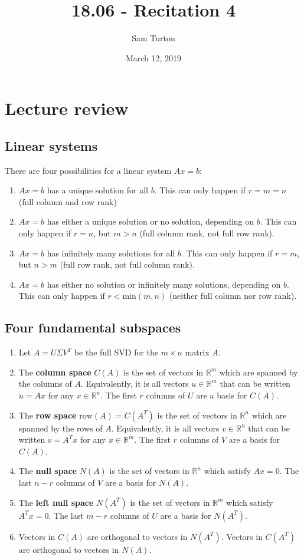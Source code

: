 \documentclass[11pt]{article}
\title{18.06 - Recitation 4}
\author{Sam Turton}
\date{March 12, 2019}
\begin{document}
\maketitle

\section{Lecture review}
\subsection{Linear systems}
There are four possibilities for a linear system $Ax = b$: 
\begin{enumerate}
\item $Ax = b$ has a unique solution for all $b$. This can only happen if $r=m=n$ (full column and row rank)
\item $Ax=b$ has either a unique solution or no solution, depending on $b$. This can only happen if $r=n$, but $m>n$ (full column rank, not full row rank).
\item $Ax=b$ has infinitely many solutions for all $b$. This can only happen if $r=m$, but $n>m$ (full row rank, not full column rank).
\item $Ax = b$ has either no solution or infinitely many solutions, depending on $b$. This can only happen if $r<\text{min}(m,n)$ (neither full column nor row rank). 
\end{enumerate}


\subsection{Four fundamental subspaces}
\begin{enumerate}
\item Let $A=U\Sigma V^T$ be the full SVD for the $m\times n$ matrix $A$. 
\item The \textbf{column space} $C(A)$ is the set of vectors in $\mathbb{R}^m$ which are spanned by the columns of $A$. Equivalently, it is all vectors $u\in\mathbb{R}^m$ that can be written $u=Ax$ for any $x\in\mathbb{R}^n$. The first $r$ columns of $U$ are a basis for $C(A)$.
\item The \textbf{row space} $\text{row}(A)=C(A^T)$ is the set of vectors in $\mathbb{R}^n$ which are spanned by the rows of $A$. Equivalently, it is all vectors $v\in\mathbb{R}^n$ that can be written $v=A^Tx$ for any $x\in\mathbb{R}^m$. The first $r$ columns of $V$ are a basis for $C(A)$.
\item The \textbf{null space} $N(A)$ is the set of vectors in $\mathbb{R}^n$ which satisfy $Ax = 0$. The last $n-r$ columns of $V$ are a basis for $N(A)$.
\item The \textbf{left null space} $N(A^T)$ is the set of vectors in $\mathbb{R}^m$ which satisfy $A^Tx=0$. The last $m-r$ columns of $U$ are a basis for $N(A^T)$.
\item Vectors in $C(A)$ are orthogonal to vectors in $N(A^T)$. Vectors in $C(A^T)$ are orthogonal to vectors in $N(A)$. 
\end{enumerate}
\end{document}
